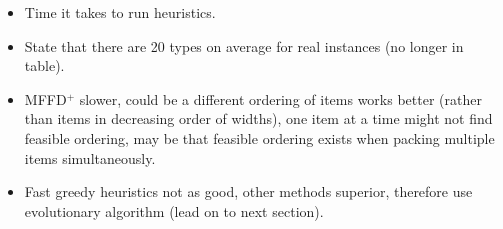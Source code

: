 \documentclass{elsarticle}
\begin{document}
\begin{comment}
\begin{table}[h!]
\centering
\caption{average number of items per strip - MFFD vs MFFD$^+$}
	\begin{tabular}{ccccc}\toprule
		Instance & $W$ & items/lb & MFFD & MFFD$^+$ \\ \midrule	
		a,100 & 2500 & 4.288 & 3.252 & 3.514 \\
		a,100 & 5000 & 8.388 & 4.240 & 5.030 \\
		\midrule
		a,500 & 2500 & 4.350 & 3.566 & 3.769 \\
		a,500 & 5000 & 8.662 & 4.845 & 5.584 \\
		\midrule
		a,1000 & 2500 & 4.358 & 3.678 & 3.870 \\
		a,1000 & 5000 & 8.698 & 5.042 & 5.793 \\
		\midrule
		\midrule
		r,100 & 2500 & 4.260 & 2.698 & 2.823 \\
		r,100 & 5000 & 8.347 & 3.091 & 3.377 \\
		\midrule
		r,500 & 2500 & 4.339 & 2.716 & 2.821 \\
		r,500 & 5000 & 8.641 & 3.052 & 3.259 \\
		\midrule
		r,1000 & 2500 & 4.349 & 2.714 & 2.817 \\
		r,1000 & 5000 & 8.679 & 3.043 & 3.240 \\
		\bottomrule
	\end{tabular}	
\end{table}
\end{comment}

{\color{myPink}
\begin{itemize}[leftmargin=*]
	\item Time it takes to run heuristics.
	\item State that there are 20 types on average for real instances (no longer in table).
	\item MFFD$^+$ slower, could be a different ordering of items works better (rather than items in decreasing order of widths), one item at a time might not find feasible ordering, may be that feasible ordering exists when packing multiple items simultaneously.
	\item Fast greedy heuristics not as good, other methods superior, therefore use evolutionary algorithm (lead on to next section).
\end{itemize}
}

\end{document}
